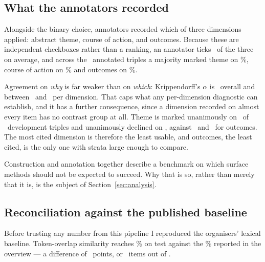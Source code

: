 \documentclass[11pt,letterpaper,twocolumn]{article}
\begin{document}
\subsection{What the annotators recorded}


Alongside the binary choice, annotators recorded which of three dimensions
applied: abstract theme, course of action, and outcomes. Because these are
independent checkboxes rather than a ranking, an annotator ticks
\AnnDimsPerJudgment\ of the three on average, and across the \AnnPoolN\
annotated triples a majority marked theme on \AnnThemePct\%, course of action
on \AnnActionPct\% and outcomes on \AnnOutcomePct\%.

Agreement on \emph{why} is far weaker than on \emph{which}: Krippendorff's
$\alpha$ is \AlphaOverall\ overall and between \AlphaPerDimLo\ and
\AlphaPerDimHi\ per dimension. That caps what any per-dimension diagnostic can
establish, and it has a further consequence, since a dimension recorded on
almost every item has no contrast group at all. Theme is marked unanimously on
\StratThemeMarked\ of \DevN\ development triples and unanimously declined on
\StratThemeUnmarked, against \StratOutcomeMarked\ and \StratOutcomeUnmarked\
for outcomes. The most cited dimension is therefore the least usable, and
outcomes, the least cited, is the only one with strata large enough to
compare.

Construction and annotation together describe a benchmark on which surface
methods should not be expected to succeed. Why that is so, rather than merely
that it is, is the subject of Section~\ref{sec:analysis}.


\subsection{Reconciliation against the published baseline}
Before trusting any number from this pipeline I reproduced the organisers'
lexical baseline. Token-overlap similarity reaches \JaccardTestAcc\% on test
against the \PublishedJaccardTest\% reported in the overview --- a difference of
\JaccardGapPts\ points, or \JaccardGapItems\ items out of \TestN.
\end{document}

